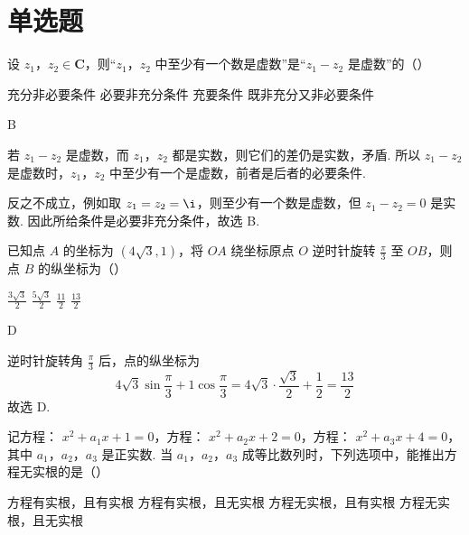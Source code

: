 \section{单选题}

\begin{problem}
设 \(z_{1}\)，\(z_{2} \in \mathbf{C}\)，则“\(z_{1}\)，\(z_{2}\) 中至少有一个数是虚数”是“\(z_{1} - z_{2}\) 是虚数”的（\quad）

\choices
    {充分非必要条件}
    {必要非充分条件}
    {充要条件}
    {既非充分又非必要条件}
\end{problem}

\begin{answer}
B
\end{answer}

\begin{solution}
若 \(z_1-z_2\) 是虚数，而 \(z_1\)，\(z_2\) 都是实数，则它们的差仍是实数，矛盾. 所以 \(z_1-z_2\) 是虚数时，\(z_1\)，\(z_2\) 中至少有一个是虚数，前者是后者的必要条件.

反之不成立，例如取 \(z_1=z_2=\i\)，则至少有一个数是虚数，但 \(z_1-z_2=0\) 是实数. 因此所给条件是必要非充分条件，故选 B.
\end{solution}

\begin{problem}
已知点 \(A\) 的坐标为 \((4\sqrt{3}, 1)\)，将 \(OA\) 绕坐标原点 \(O\) 逆时针旋转 \(\frac{\pi}{3}\) 至 \(OB\)，则点 \(B\) 的纵坐标为（\quad）

\choices
    {\(\frac{3\sqrt{3}}{2}\)}
    {\(\frac{5\sqrt{3}}{2}\)}
    {\(\frac{11}{2}\)}
    {\(\frac{13}{2}\)}
\end{problem}

\begin{answer}
D
\end{answer}

\begin{solution}
逆时针旋转角 \(\frac\pi3\) 后，点的纵坐标为
\[
4\sqrt3\sin\frac\pi3+1\cos\frac\pi3=4\sqrt3\cdot\frac{\sqrt3}{2}+\frac12=\frac{13}{2}
\]
故选 D.
\end{solution}

\begin{problem}
记方程： \( x^{2} + a_{1}x + 1 = 0 \)，方程： \( x^{2} + a_{2}x + 2 = 0 \)，方程： \( x^{2} + a_{3}x + 4 = 0 \)，其中 \(a_{1}\)，\(a_{2}\)，\(a_{3}\) 是正实数. 当 \(a_{1}\)，\(a_{2}\)，\(a_{3}\) 成等比数列时，下列选项中，能推出方程无实根的是（\quad）

\choices
    {方程有实根，且有实根}
    {方程有实根，且无实根}
    {方程无实根，且有实根}
    {方程无实根，且无实根}
\end{problem}

